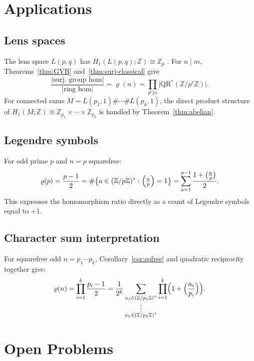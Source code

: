 \documentclass[12pt]{amsart}
\theoremstyle{bluehead}
\theoremstyle{orangehead}
\theoremstyle{greenhead}
\newcommand{\Z}{\mathbb{Z}}
\newcommand{\QRS}{\mathrm{QR}^{*}}
\begin{document}
\section{Applications}\label{sec:apps}

\subsection{Lens spaces}

The lens space $L(p,q)$ has $H_1(L(p,q);\Z)\cong\Z_p$ \cite{hatcher}.
For $n\mid m$, Theorems~\ref{thm:GVB} and~\ref{thm:surj-classical} give
\[
  \frac{|\text{surj.\ group hom}|}{|\text{ring hom}|}
  =\varrho(n)=\prod_{p^r\Vert n}\bigl|\QRS(\Z/p^r\Z)\bigr|.
\]
For connected sums $M=L(p_1,1)\#\cdots\#L(p_k,1)$, the direct product
structure of $H_1(M;\Z)\cong\Z_{p_1}\times\cdots\times\Z_{p_k}$ is
handled by Theorem~\ref{thm:abelian}.

\subsection{Legendre symbols}

For odd prime $p$ and $n=p$ squarefree:
\[
  \varrho(p)=\frac{p-1}{2}
  =\#\bigl\{a\in(\Z/p\Z)^*:\Bigl(\tfrac{a}{p}\Bigr)=1\bigr\}
  =\sum_{a=1}^{p-1}\frac{1+\bigl(\frac{a}{p}\bigr)}{2}.
\]
This expresses the homomorphism ratio directly as a count of Legendre
symbols equal to $+1$.

\subsection{Character sum interpretation}

For squarefree odd $n=p_1\cdots p_k$, Corollary~\ref{cor:sqfree} and
quadratic reciprocity together give:
\[
  \varrho(n)
  =\prod_{i=1}^k\frac{p_i-1}{2}
  =\frac{1}{2^k}\sum_{\substack{a_1\in(\Z/p_1\Z)^*\\\vdots\\a_k\in(\Z/p_k\Z)^*}}
   \prod_{i=1}^k\Bigl(1+\Bigl(\frac{a_i}{p_i}\Bigr)\Bigr).
\]

\section{Open Problems}\label{sec:open}
\end{document}
